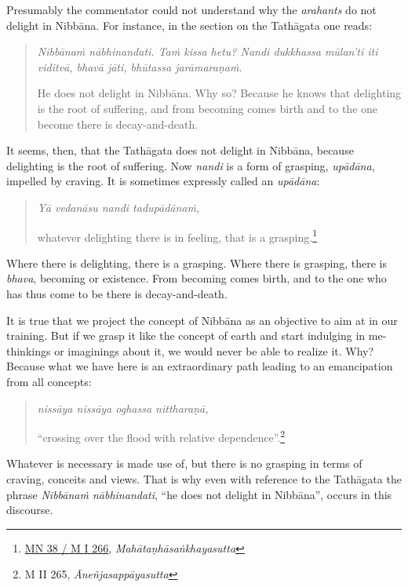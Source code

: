 Presumably the commentator could not understand why the \emph{arahants} do not delight in Nibbāna. For instance, in the section on the Tathāgata one reads:

\begin{quote}
\emph{Nibbānaṁ nābhinandati. Taṁ kissa hetu? Nandi dukkhassa mūlan'ti iti viditvā, bhavā jāti, bhūtassa jarāmaraṇaṁ.}

He does not delight in Nibbāna. Why so? Because he knows that delighting is the root of suffering, and from becoming comes birth and to the one become there is decay-and-death.
\end{quote}

It seems, then, that the Tathāgata does not delight in Nibbāna, because delighting is the root of suffering. Now \emph{nandi} is a form of grasping, \emph{upādāna}, impelled by craving. It is sometimes expressly called an \emph{upādāna}:

\begin{quote}
\emph{Yā vedanāsu nandi tadupādānaṁ,}

whatever delighting there is in feeling, that is a grasping.\footnote{\href{https://suttacentral.net/mn38/pli/ms}{MN 38 / M I 266}, \emph{Mahātaṇhāsaṅkhayasutta}}
\end{quote}

Where there is delighting, there is a grasping. Where there is grasping, there is \emph{bhava}, becoming or existence. From becoming comes birth, and to the one who has thus come to be there is decay-and-death.

It is true that we project the concept of Nibbāna as an objective to aim at in our training. But if we grasp it like the concept of earth and start indulging in me-thinkings or imaginings about it, we would never be able to realize it. Why? Because what we have here is an extraordinary path leading to an emancipation from all concepts:

\clearpage

\begin{quote}
\emph{nissāya nissāya oghassa nittharaṇā,}

``crossing over the flood with relative dependence''.\footnote{M II 265, \emph{Āneñjasappāyasutta}}
\end{quote}

Whatever is necessary is made use of, but there is no grasping in terms of craving, conceits and views. That is why even with reference to the Tathāgata the phrase \emph{Nibbānaṁ nābhinandati}, ``he does not delight in Nibbāna'', occurs in this discourse.

